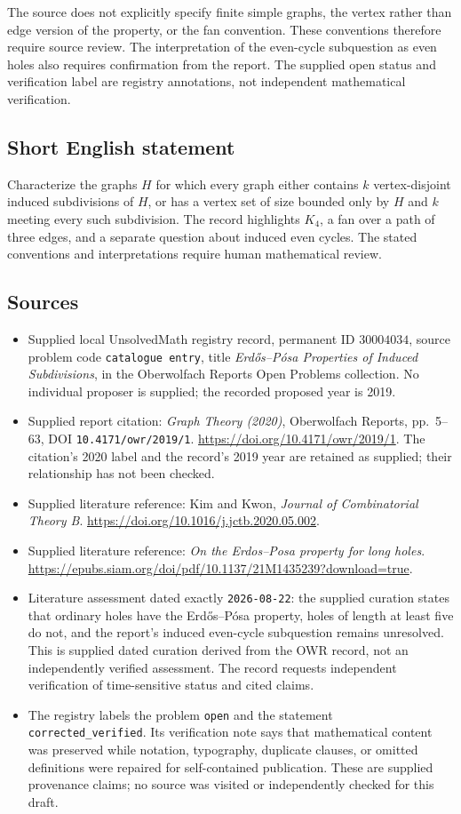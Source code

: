 \documentclass[11pt]{article}
\begin{document}
The source does not explicitly specify finite simple graphs, the vertex rather than edge version of the property, or the fan convention. These conventions therefore require source review. The interpretation of the even-cycle subquestion as even holes also requires confirmation from the report. The supplied open status and verification label are registry annotations, not independent mathematical verification.
\subsection{Short English statement}
Characterize the graphs \(H\) for which every graph either contains \(k\) vertex-disjoint induced subdivisions of \(H\), or has a vertex set of size bounded only by \(H\) and \(k\) meeting every such subdivision. The record highlights \(K_4\), a fan over a path of three edges, and a separate question about induced even cycles. The stated conventions and interpretations require human mathematical review.
\subsection{Sources}
\begin{itemize}
\item Supplied local UnsolvedMath registry record, permanent ID \(30004034\), source problem code \texttt{catalogue entry}, title \emph{Erdős--Pósa Properties of Induced Subdivisions}, in the Oberwolfach Reports Open Problems collection. No individual proposer is supplied; the recorded proposed year is 2019.
\item Supplied report citation: \emph{Graph Theory (2020)}, Oberwolfach Reports, pp.\ 5--63, DOI \texttt{10.4171/owr/2019/1}. \url{https://doi.org/10.4171/owr/2019/1}. The citation's 2020 label and the record's 2019 year are retained as supplied; their relationship has not been checked.
\item Supplied literature reference: Kim and Kwon, \emph{Journal of Combinatorial Theory B}. \url{https://doi.org/10.1016/j.jctb.2020.05.002}.
\item Supplied literature reference: \emph{On the Erdos--Posa property for long holes}. \url{https://epubs.siam.org/doi/pdf/10.1137/21M1435239?download=true}.
\item Literature assessment dated exactly \texttt{2026-08-22}: the supplied curation states that ordinary holes have the Erdős--Pósa property, holes of length at least five do not, and the report's induced even-cycle subquestion remains unresolved. This is supplied dated curation derived from the OWR record, not an independently verified assessment. The record requests independent verification of time-sensitive status and cited claims.
\item The registry labels the problem \texttt{open} and the statement \texttt{corrected\_verified}. Its verification note says that mathematical content was preserved while notation, typography, duplicate clauses, or omitted definitions were repaired for self-contained publication. These are supplied provenance claims; no source was visited or independently checked for this draft.
\end{itemize}
\end{document}
